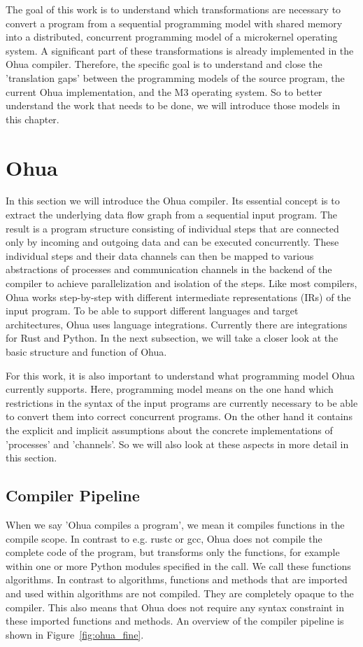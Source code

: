 The goal of this work is to understand which transformations are necessary to convert a program from a sequential programming model with shared memory into a distributed, concurrent programming model of a microkernel operating system. A significant part of these transformations is already implemented in the Ohua compiler. Therefore, the specific goal is to understand and close the 'translation gaps' between the programming models of the source program, the current Ohua implementation, and the M3 operating system. So to better understand the work that needs to be done, we will introduce those models in this chapter.

\section{Ohua}
\label{sec:back_ohua}
In this section we will introduce the Ohua compiler\cite{ertel2015ohua}. Its essential concept is to extract the underlying data flow graph from a sequential input program. The result is a program structure consisting of individual steps that are connected only by incoming and outgoing data and can be executed concurrently. These individual steps and their data channels can then be mapped to various abstractions of processes and communication channels in the backend of the compiler to achieve parallelization and isolation of the steps. Like most compilers, Ohua works step-by-step with different intermediate representations (IRs) of the input program. To be able to support different languages and target architectures, Ohua uses language integrations. Currently there are integrations for Rust and Python. In the next subsection, we will take a closer look at the basic structure and function of Ohua. 

For this work, it is also important to understand what programming model Ohua currently supports. Here, programming model means on the one hand which restrictions in the syntax of the input programs are currently necessary to be able to convert them into correct concurrent programs. On the other hand it contains the explicit and implicit assumptions about the concrete implementations of 'processes' and 'channels'. So we will also look at these aspects in more detail in this section.

\subsection{Compiler Pipeline}
\label{subec:OhuaPipeline}
When we say 'Ohua compiles a program', we mean it compiles functions in the compile scope. In contrast to e.g. rustc or gcc, Ohua does not compile the complete code of the program, but transforms only the functions, for example within one or more Python modules specified in the call. We call these functions algorithms. In contrast to algorithms, functions and methods that are imported and used within algorithms are not compiled. They are completely opaque to the compiler. This also means that Ohua does not require any syntax constraint in these imported functions and methods. An overview of the compiler pipeline is shown in Figure~\ref{fig:ohua_fine}.  

